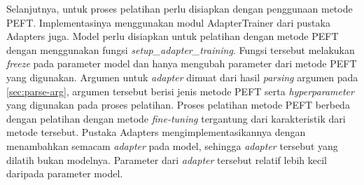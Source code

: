 Selanjutnya, untuk proses pelatihan perlu disiapkan dengan penggunaan metode PEFT. Implementasinya menggunakan modul AdapterTrainer dari pustaka Adapters juga. Model perlu disiapkan untuk pelatihan dengan metode PEFT dengan menggunakan fungsi \textit{setup\_adapter\_training}. Fungsi tersebut  melakukan \textit{freeze} pada parameter model dan hanya  mengubah parameter dari metode PEFT yang digunakan. Argumen untuk \textit{adapter} dimuat dari hasil \textit{parsing} argumen pada \ref{sec:parse-arg}, argumen tersebut berisi jenis metode PEFT serta \textit{hyperparameter} yang digunakan pada proses pelatihan. Proses pelatihan metode PEFT berbeda dengan pelatihan dengan metode \textit{fine-tuning} tergantung dari karakteristik dari metode tersebut. Pustaka Adapters mengimplementasikannya dengan menambahkan semacam \textit{adapter} pada model, sehingga \textit{adapter} tersebut yang dilatih bukan modelnya. Parameter dari \textit{adapter} tersebut relatif lebih kecil daripada parameter model.
